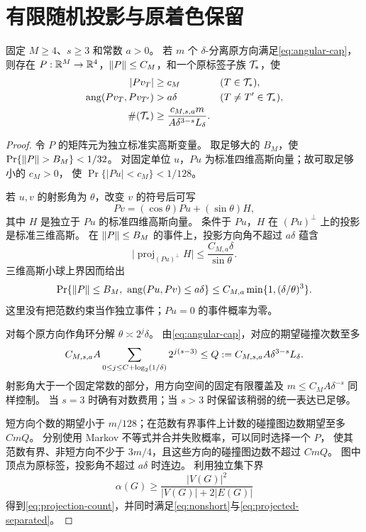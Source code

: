 \section{有限随机投影与原着色保留}\label{sec:projection}

\begin{lemma}[方向碰撞与非短投影]\label{lem:projection}
固定 $M\ge4$、$s\ge3$ 和常数 $a>0$。
若 $m$ 个 $\delta$-分离原方向满足\eqref{eq:angular-cap}，则存在
$P:\mathbb R^M\to\mathbb R^4$，$\left\lVert P\right\rVert\le C_M$，和一个原标签子族 $\mathcal T_*$，使
\begin{align}
 |Pv_T|&\ge c_M &&(T\in\mathcal T_*),\label{eq:nonshort}\\
 \operatorname{ang}(Pv_T,Pv_{T'})&>a\delta &&(T\ne T'\in\mathcal T_*),\label{eq:projected-separated}\\
 \#\!\left(\mathcal T_*\right)&\ge
 \frac{c_{M,s,a}m}{A\delta^{3-s}L_\delta}.\label{eq:projection-count}
\end{align}
\end{lemma}

\begin{proof}
令 $P$ 的矩阵元为独立标准实高斯变量。
取足够大的 $B_M$，使 $\Pr\{\left\lVert P\right\rVert>B_M\}<1/32$。
对固定单位 $u$，$Pu$ 为标准四维高斯向量；故可取足够小的 $c_M>0$，
使 $\Pr\{|Pu|<c_M\}<1/128$。

若 $u,v$ 的射影角为 $\theta$，改变 $v$ 的符号后可写
\[
 Pv=(\cos\theta)Pu+(\sin\theta)H,
\]
其中 $H$ 是独立于 $Pu$ 的标准四维高斯向量。
条件于 $Pu$，$H$ 在 $(Pu)^\perp$ 上的投影是标准三维高斯。
在 $\left\lVert P\right\rVert\le B_M$ 的事件上，投影方向角不超过 $a\delta$ 蕴含
\[
 \big|\operatorname{proj}_{(Pu)^\perp}H\big|
 \le \frac{C_{M,a}\delta}{\sin\theta}.
\]
三维高斯小球上界因而给出
\begin{equation}\label{eq:collision-probability}
 \Pr\{\left\lVert P\right\rVert\le B_M,\ \operatorname{ang}(Pu,Pv)\le a\delta\}
 \le C_{M,a}\min\{1,(\delta/\theta)^3\}.
\end{equation}
这里没有把范数约束当作独立事件；$Pu=0$ 的事件概率为零。

对每个原方向作角环分解 $\theta\asymp2^j\delta$。
由\eqref{eq:angular-cap}，对应的期望碰撞次数至多
\begin{equation}\label{eq:collision-degree}
 C_{M,s,a}A\sum_{0\le j\le C+\log_2(1/\delta)}2^{j(s-3)}
 \le Q:=C_{M,s,a}A\delta^{3-s}L_\delta.
\end{equation}
射影角大于一个固定常数的部分，用方向空间的固定有限覆盖及
$m\le C_MA\delta^{-s}$ 同样控制。
当 $s=3$ 时确有对数费用；当 $s>3$ 时保留该稍弱的统一表达已足够。

短方向个数的期望小于 $m/128$；在范数有界事件上计数的碰撞图边数期望至多 $CmQ$。
分别使用 Markov 不等式并合并失败概率，可以同时选择一个 $P$，
使其范数有界、非短方向不少于 $3m/4$，且这些方向的碰撞图边数不超过 $CmQ$。
图中顶点为原标签，投影角不超过 $a\delta$ 时连边。
利用独立集下界
\[
 \alpha(G)\ge\frac{|V(G)|^2}{|V(G)|+2|E(G)|}
\]
得到\eqref{eq:projection-count}，并同时满足\eqref{eq:nonshort}与\eqref{eq:projected-separated}。
\end{proof}

